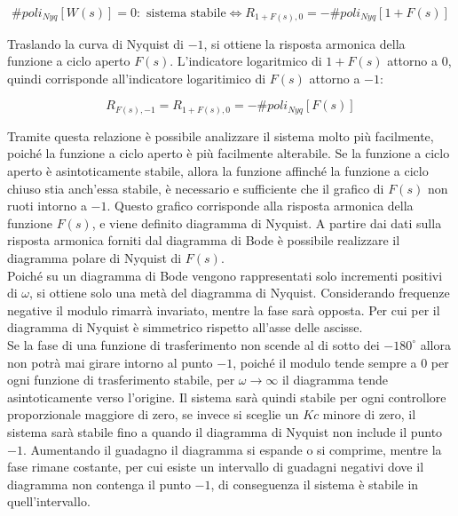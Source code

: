 \documentclass{article}
\numberwithin{equation}{subsection}
\begin{document}
\begin{equation}
    \#poli_{Nyq}[W(s)]=0:\mbox{ sistema stabile}\iff R_{1+F(s),0}=-\#poli_{Nyq}[1+F(s)]
\end{equation}

Traslando la curva di Nyquist di $-1$, si ottiene la risposta armonica della funzione a ciclo aperto $F(s)$. L'indicatore logaritmico di $1+F(s)$ attorno a $0$, quindi 
corrisponde all'indicatore logaritimico di $F(s)$ attorno a $-1$:

\begin{equation}
    R_{F(s),-1}=R_{1+F(s),0}=-\#poli_{Nyq}[F(s)]
\end{equation}

Tramite questa relazione è possibile analizzare il sistema molto più facilmente, poiché la funzione a ciclo aperto è più facilmente alterabile. Se la funzione a ciclo aperto 
è asintoticamente stabile, allora la funzione affinché la funzione a ciclo chiuso stia anch'essa stabile, è necessario e sufficiente che il grafico di $F(s)$ non ruoti 
intorno a $-1$. Questo grafico corrisponde alla risposta armonica della funzione $F(s)$, e viene definito diagramma di Nyquist. A partire dai dati sulla risposta armonica 
forniti dal diagramma di Bode è possibile realizzare il diagramma polare di Nyquist di $F(s)$.  \\

Poiché su un diagramma di Bode vengono rappresentati solo incrementi positivi di $\omega$, si ottiene solo una metà del diagramma di Nyquist. Considerando frequenze negative 
il modulo rimarrà invariato, mentre la fase sarà opposta. Per cui per il diagramma di Nyquist è simmetrico rispetto all'asse delle ascisse.\\

Se la fase di una funzione di trasferimento non scende al di sotto dei $-180^{\circ}$ allora non potrà mai girare intorno al punto $-1$, poiché il modulo tende sempre 
a $0$ per ogni funzione di trasferimento stabile, per $\omega\to\infty$ il diagramma tende asintoticamente verso l'origine. Il sistema sarà quindi stabile per ogni 
controllore proporzionale maggiore di zero, se invece si sceglie un $Kc$ minore di zero, il sistema sarà stabile fino a quando il diagramma di Nyquist non include il 
punto $-1$. Aumentando il guadagno il diagramma si espande o si comprime, mentre la fase rimane costante, per cui esiste un intervallo di guadagni negativi dove il 
diagramma non contenga il punto $-1$, di conseguenza il sistema è stabile in quell'intervallo. 
\end{document}
